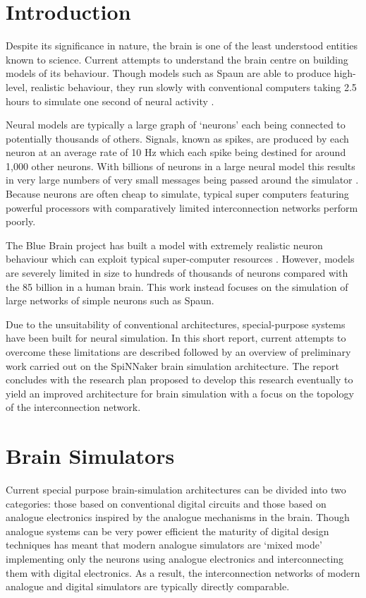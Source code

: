 \section{Introduction}
	
	Despite its significance in nature, the brain is one of the least understood
	entities known to science. Current attempts to understand the brain centre on
	building models of its behaviour. Though models such as Spaun are able to
	produce high-level, realistic behaviour, they run slowly with conventional
	computers taking 2.5 hours to simulate one second of neural activity
	\cite{eliasmith12}.
	
	Neural models are typically a large graph of `neurons' each being connected to
	potentially thousands of others. Signals, known as spikes, are produced by
	each neuron at an average rate of 10 Hz which each spike being destined for
	around 1,000 other neurons. With billions of neurons in a large neural model
	this results in very large numbers of very small messages being passed around
	the simulator \cite{vainbrand11}. Because neurons are often cheap to simulate,
	typical super computers featuring powerful processors with comparatively
	limited interconnection networks perform poorly.
	
	The Blue Brain project has built a model with extremely realistic neuron
	behaviour which can exploit typical super-computer resources \cite{markram06}.
	However, models are severely limited in size to hundreds of thousands of
	neurons compared with the 85 billion in a human brain. This work instead
	focuses on the simulation of large networks of simple neurons such as Spaun.
	
	Due to the unsuitability of conventional architectures, special-purpose
	systems have been built for neural simulation. In this short report, current
	attempts to overcome these limitations are described followed by an overview
	of preliminary work carried out on the SpiNNaker brain simulation
	architecture. The report concludes with the research plan proposed to develop
	this research eventually to yield an improved architecture for brain
	simulation with a focus on the topology of the interconnection network.

\section{Brain Simulators}
	
	Current special purpose brain-simulation architectures can be divided into two
	categories: those based on conventional digital circuits and those based on
	analogue electronics inspired by the analogue mechanisms in the brain. Though
	analogue systems can be very power efficient the maturity of digital design
	techniques has meant that modern analogue simulators are `mixed mode'
	implementing only the neurons using analogue electronics and interconnecting
	them with digital electronics. As a result, the interconnection networks of
	modern analogue and digital simulators are typically directly comparable.
	
